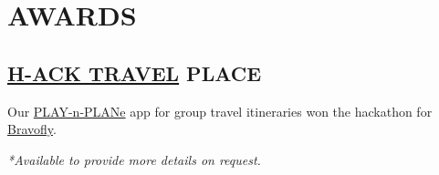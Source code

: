 \documentclass[]{deedy-resume-reversed}
\begin{document}
\begin{minipage}[t]{0.35\textwidth}
\section{AWARDS}

\subsection{\href{https://www.h-farm.com/it/nostri-eventi-hack}{H-ACK TRAVEL}  PLACE}
Our \href{https://drive.google.com/file/d/0B2vKVAUdRszZblFaNTQ2SnRiV3c/}{PLAY-n-PLANe} app for group travel itineraries won the hackathon for \href{https://www.bravofly.com/}{Bravofly}.

\vspace{3pt}
\small{\textit{*Available to provide more details on request.}}

\end{minipage}

%
%
\privacy
\end{document}
